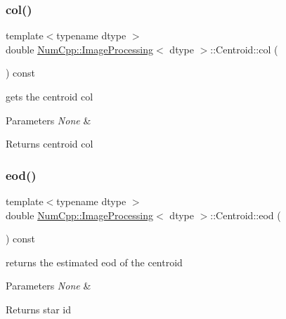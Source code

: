 \subsubsection{\texorpdfstring{col()}{col()}}
{\footnotesize\ttfamily template$<$typename dtype $>$ \\
double \mbox{\hyperlink{class_num_cpp_1_1_image_processing}{Num\+Cpp\+::\+Image\+Processing}}$<$ dtype $>$\+::Centroid\+::col (\begin{DoxyParamCaption}{ }\end{DoxyParamCaption}) const\hspace{0.3cm}{\ttfamily [inline]}}

gets the centroid col


\begin{DoxyParams}{Parameters}
{\em None} & \\
\hline
\end{DoxyParams}
\begin{DoxyReturn}{Returns}
centroid col 
\end{DoxyReturn}
\mbox{\label{class_num_cpp_1_1_image_processing_1_1_centroid_a770b6454957dbf2615522d14e4aa57f2}} 
\subsubsection{\texorpdfstring{eod()}{eod()}}
{\footnotesize\ttfamily template$<$typename dtype $>$ \\
double \mbox{\hyperlink{class_num_cpp_1_1_image_processing}{Num\+Cpp\+::\+Image\+Processing}}$<$ dtype $>$\+::Centroid\+::eod (\begin{DoxyParamCaption}{ }\end{DoxyParamCaption}) const\hspace{0.3cm}{\ttfamily [inline]}}

returns the estimated eod of the centroid


\begin{DoxyParams}{Parameters}
{\em None} & \\
\hline
\end{DoxyParams}
\begin{DoxyReturn}{Returns}
star id 
\end{DoxyReturn}
\mbox{\label{class_num_cpp_1_1_image_processing_1_1_centroid_ab0e97e8341f54295e5f1be508b539ae8}} 
